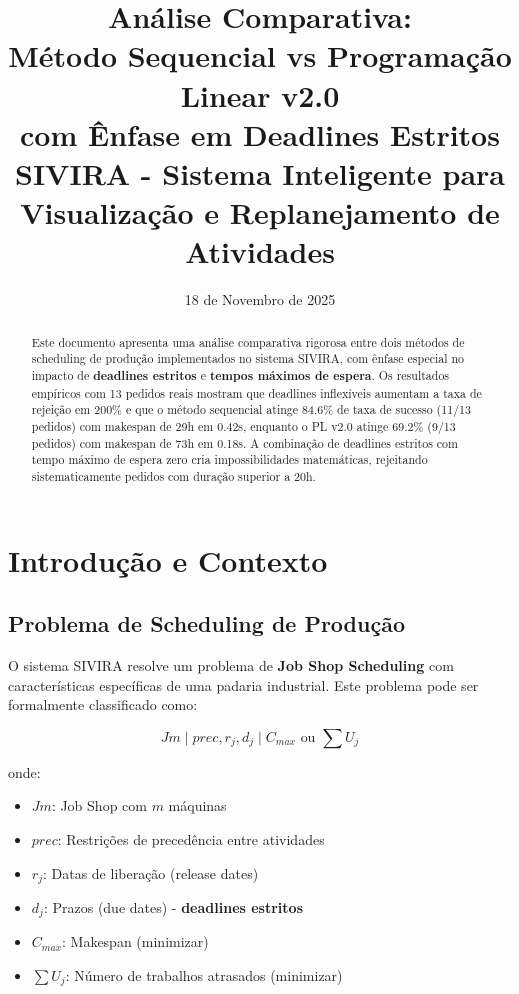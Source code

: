 \documentclass[11pt,a4paper]{article}
\title{\textbf{Análise Comparativa: \\
Método Sequencial vs Programação Linear v2.0\\
com Ênfase em Deadlines Estritos}\\
\vspace{0.3cm}
\large  SIVIRA - Sistema Inteligente para Visualização e Replanejamento de Atividades}
\date{18 de Novembro de 2025}
\begin{document}
\maketitle

\begin{abstract}
Este documento apresenta uma análise comparativa rigorosa entre dois métodos de scheduling de produção implementados no sistema SIVIRA, com ênfase especial no impacto de \textbf{deadlines estritos} e \textbf{tempos máximos de espera}. Os resultados empíricos com 13 pedidos reais mostram que deadlines inflexíveis aumentam a taxa de rejeição em 200\% e que o método sequencial atinge 84.6\% de taxa de sucesso (11/13 pedidos) com makespan de 29h em 0.42s, enquanto o PL v2.0 atinge 69.2\% (9/13 pedidos) com makespan de 73h em 0.18s. A combinação de deadlines estritos com tempo máximo de espera zero cria impossibilidades matemáticas, rejeitando sistematicamente pedidos com duração superior a 20h.
\end{abstract}

\tableofcontents
\newpage

\section{Introdução e Contexto}

\subsection{Problema de Scheduling de Produção}

O sistema SIVIRA resolve um problema de \textbf{Job Shop Scheduling} com características específicas de uma padaria industrial. Este problema pode ser formalmente classificado como:

\begin{equation}
Jm \mid prec, r_j, d_j \mid C_{max} \text{ ou } \sum U_j
\end{equation}

onde:
\begin{itemize}
    \item $Jm$: Job Shop com $m$ máquinas
    \item $prec$: Restrições de precedência entre atividades
    \item $r_j$: Datas de liberação (release dates)
    \item $d_j$: Prazos (due dates) - \textbf{deadlines estritos}
    \item $C_{max}$: Makespan (minimizar)
    \item $\sum U_j$: Número de trabalhos atrasados (minimizar)
\end{itemize}
\end{document}
